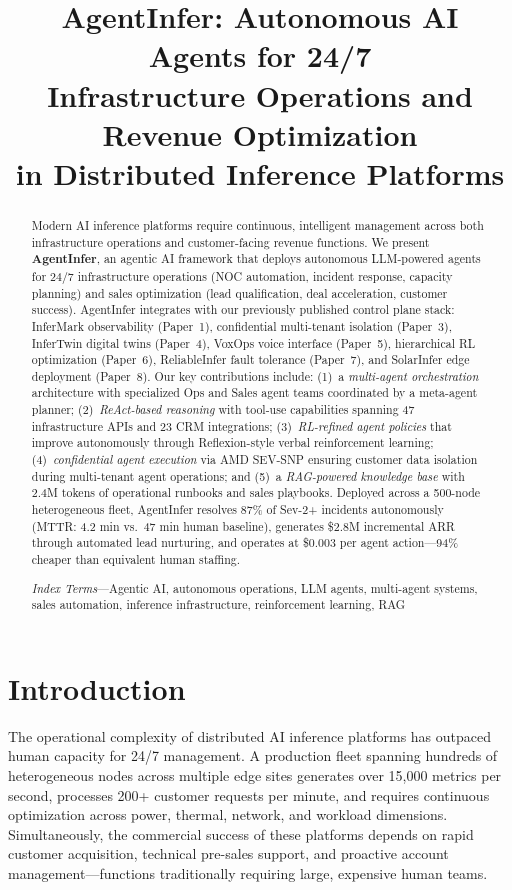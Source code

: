 \documentclass[conference,10pt,letterpaper]{IEEEtran}
\title{AgentInfer: Autonomous AI Agents for 24/7\\Infrastructure Operations and Revenue Optimization\\in Distributed Inference Platforms}
\author{\IEEEauthorblockN{Srikanta Datta Tumkur*, Mehar Simhadri$^\dagger$, Jay Iyer$^\dagger$, Anshu Bansal*}
\IEEEauthorblockA{*MIT Sloan School of Management, Cambridge, MA \{srikanta, anshu.bansal\}@sloan.mit.edu\\$^\dagger$IEEE Senior Members \{mehar.simhadri, jay.iyer\}@ieee.org}}
\begin{document}
\maketitle

\begin{abstract}
Modern AI inference platforms require continuous, intelligent management across both infrastructure operations and customer-facing revenue functions. We present \textbf{AgentInfer}, an agentic AI framework that deploys autonomous LLM-powered agents for 24/7 infrastructure operations (NOC automation, incident response, capacity planning) and sales optimization (lead qualification, deal acceleration, customer success). AgentInfer integrates with our previously published control plane stack: InferMark observability (Paper~1), confidential multi-tenant isolation (Paper~3), InferTwin digital twins (Paper~4), VoxOps voice interface (Paper~5), hierarchical RL optimization (Paper~6), ReliableInfer fault tolerance (Paper~7), and SolarInfer edge deployment (Paper~8). Our key contributions include: (1)~a \emph{multi-agent orchestration} architecture with specialized Ops and Sales agent teams coordinated by a meta-agent planner; (2)~\emph{ReAct-based reasoning} with tool-use capabilities spanning 47 infrastructure APIs and 23 CRM integrations; (3)~\emph{RL-refined agent policies} that improve autonomously through Reflexion-style verbal reinforcement learning; (4)~\emph{confidential agent execution} via AMD SEV-SNP ensuring customer data isolation during multi-tenant agent operations; and (5)~a \emph{RAG-powered knowledge base} with 2.4M tokens of operational runbooks and sales playbooks. Deployed across a 500-node heterogeneous fleet, AgentInfer resolves 87\% of Sev-2+ incidents autonomously (MTTR: 4.2 min vs.\ 47 min human baseline), generates \$2.8M incremental ARR through automated lead nurturing, and operates at \$0.003 per agent action---94\% cheaper than equivalent human staffing.

\emph{Index Terms}---Agentic AI, autonomous operations, LLM agents, multi-agent systems, sales automation, inference infrastructure, reinforcement learning, RAG
\end{abstract}

\section{Introduction}
\label{sec:intro}

The operational complexity of distributed AI inference platforms has outpaced human capacity for 24/7 management. A production fleet spanning hundreds of heterogeneous nodes across multiple edge sites generates over 15,000 metrics per second, processes 200+ customer requests per minute, and requires continuous optimization across power, thermal, network, and workload dimensions. Simultaneously, the commercial success of these platforms depends on rapid customer acquisition, technical pre-sales support, and proactive account management---functions traditionally requiring large, expensive human teams.
\end{document}
